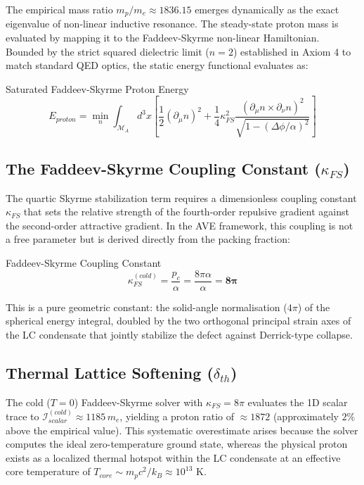 The empirical mass ratio $m_p/m_e \approx 1836.15$ emerges dynamically as the exact eigenvalue of non-linear inductive resonance. The steady-state proton mass is evaluated by mapping it to the Faddeev-Skyrme non-linear Hamiltonian. Bounded by the strict squared dielectric limit ($n=2$) established in Axiom 4 to match standard QED optics, the static energy functional evaluates as:
\begin{resultbox}{Saturated Faddeev-Skyrme Proton Energy}
\begin{equation}
E_{proton} = \min_{n} \int_{\mathcal{M}_A} d^3x \left[ \frac{1}{2}(\partial_\mu n)^2 + \frac{1}{4}\kappa_{FS}^2 \frac{(\partial_\mu n \times \partial_\nu n)^2}{\sqrt{1 - (\Delta\phi / \alpha)^2}} \right]
\end{equation}
\end{resultbox}

\subsection{The Faddeev-Skyrme Coupling Constant ($\kappa_{FS}$)}

The quartic Skyrme stabilization term requires a dimensionless coupling constant $\kappa_{FS}$ that sets the relative strength of the fourth-order repulsive gradient against the second-order attractive gradient. In the AVE framework, this coupling is not a free parameter but is derived directly from the packing fraction:
\begin{resultbox}{Faddeev-Skyrme Coupling Constant}
\begin{equation}
\kappa_{FS}^{(cold)} = \frac{p_c}{\alpha} = \frac{8\pi\alpha}{\alpha} = \mathbf{8\pi}
\end{equation}
\end{resultbox}

This is a pure geometric constant: the solid-angle normalisation ($4\pi$) of the spherical energy integral, doubled by the two orthogonal principal strain axes of the LC condensate that jointly stabilize the defect against Derrick-type collapse.

\subsection{Thermal Lattice Softening ($\delta_{th}$)}
\label{sec:thermal_softening}

The cold ($T=0$) Faddeev-Skyrme solver with $\kappa_{FS} = 8\pi$ evaluates the 1D scalar trace to $\mathcal{I}_{scalar}^{(cold)} \approx 1185\,m_e$, yielding a proton ratio of $\approx 1872$ (approximately $2\%$ above the empirical value). This systematic overestimate arises because the solver computes the ideal zero-temperature ground state, whereas the physical proton exists as a localized thermal hotspot within the LC condensate at an effective core temperature of $T_{core} \sim m_p c^2/k_B \approx 10^{13}\text{ K}$.

